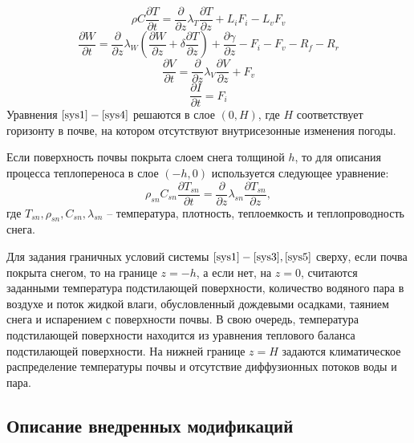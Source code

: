 \documentclass[a4paper, fontsize=14pt]{scrartcl}
\begin{document}
\begin{equation}
    \rho  C \dfrac{\partial T}{\partial t} = \dfrac{\partial }{\partial z} \lambda_T \dfrac{\partial T}{\partial z} + L_i F_i - L_v F_v  \label{sys1}
\end{equation}
\begin{equation}
    \dfrac{\partial W}{\partial t} = \dfrac{\partial }{\partial z} \lambda_W \left( \dfrac{\partial W}{\partial z} + \delta \dfrac{\partial T}{\partial z} \right) + \dfrac{\partial \gamma}{\partial z} - F_i - F_v - R_f - R_r  \label{sys2}
\end{equation}
\begin{equation}
    \dfrac{\partial V}{\partial t} = \dfrac{\partial }{\partial z} \lambda_V \dfrac{\partial V}{\partial z} + F_v  \label{sys3}
\end{equation}
\begin{equation}
    \dfrac{\partial I}{\partial t} = F_i  \label{sys4}
\end{equation}
Уравнения $\eqref{sys1} - \eqref{sys4}$ решаются в слое $(0, H)$, где $H$ соответствует горизонту в почве, на котором отсутствуют внутрисезонные изменения погоды.

Если поверхность почвы покрыта слоем снега толщиной $h$, то для описания процесса теплопереноса в слое $(-h, 0)$ используется следующее уравнение:
\begin{equation}
    \rho_{sn} C_{sn} \dfrac{\partial T_{sn}}{\partial t} = \dfrac{\partial }{\partial z} \lambda_{sn} \dfrac{\partial T_{sn}}{\partial z},  \label{sys5}
\end{equation}
где $T_{sn}, \rho_{sn}, C_{sn}, \lambda_{sn}$ -- температура, плотность, теплоемкость и теплопроводность снега.

Для задания граничных условий системы $\eqref{sys1} - \eqref{sys3}, \eqref{sys5}$ сверху, если почва покрыта снегом, то на границе $z = -h$, а если нет, на $z = 0$, считаются заданными температура подстилающей поверхности, количество водяного пара в воздухе и поток жидкой влаги, обусловленный дождевыми осадками, таянием снега и испарением с поверхности почвы. В свою очередь, температура подстилающей поверхности находится из уравнения теплового баланса подстилающей поверхности. На нижней границе $z = H$ задаются климатическое распределение температуры почвы и отсутствие диффузионных потоков воды и пара. 

\subsection{Описание внедренных модификаций}
\end{document}
